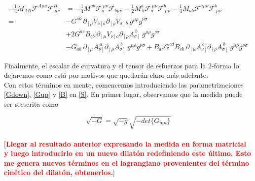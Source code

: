 \documentclass{article}
\numberwithin{equation}{section}
\begin{document}
\begin{equation}\label{MFF}
\begin{aligned}
-\frac{1}{4} M_{A B} \mathcal{F}^{A \mu \nu} \mathcal{F}^B_{\ \mu \nu} &= -\frac{1}{4} M^{a b} \mathcal{F}_a^{\ \mu \nu} \mathcal{F}_{b \mu \nu} -\frac{1}{2} M^a_{\ b} \mathcal{F}_a^{\ \mu \nu} \mathcal{F}^b_{\ \mu \nu} -\frac{1}{4} M_{a b} \mathcal{F}^{a \mu \nu} \mathcal{F}^b_{\ \mu \nu}\\
=& - G^{a b} \ \partial_{\left[\mu\right.} V_{\left.\nu\right] a} \partial_{\left[\rho\right.} V_{\left.\sigma\right] b} \ g^{\mu \rho} g^{\nu \sigma}\\
&+ 2 G^{a c} B_{c b} \ \partial_{\left[\mu\right.} V_{\left.\nu\right] a} \partial_{\left[\rho\right.} A_{\left.\sigma\right]}^{\ b} \ g^{\mu \rho} g^{\nu \sigma}\\
&- G_{a b} \ \partial_{\left[\mu\right.} A_{\left.\nu\right]}^{\ a} \partial_{\left[\rho\right.} A_{\left.\sigma\right]}^{\ b} \ g^{\mu \rho} g^{\nu \sigma} + B_{a c} G^{c d} B_{c b} \ \partial_{\left[\mu\right.} A_{\left.\nu\right]}^{\ b} \partial_{\left[\rho\right.} A_{\left.\sigma\right]}^{\ b} \ g^{\mu \rho} g^{\nu \sigma}
\end{aligned}
\end{equation}

Finalmente, el escalar de curvatura y el tensor de esfuerzos para la 2-forma lo dejaremos como está por motivos que quedarán claro más adelante.\\

Con estos términos en mente, comencemos introduciendo las parametrizaciones \ref{Gdown}, \ref{Gup} y \ref{B} en \ref{S}. En primer lugar, observamos que la medida puede ser reescrita como

\begin{equation}
\sqrt{-G} = \sqrt{-g} \sqrt{-det\{ G_{m n}\}}
\end{equation}\\

[\textcolor{red}{\textbf{Llegar al resultado anterior expresando la medida en forma matricial y luego introducirlo en un nuevo dilatón redefiniendo este último. Esto me genera nuevos términos en el lagrangiano provenientes del término cinético del dilatón, obtenerlos.}}]\\
\end{document}
